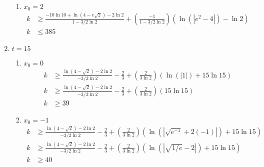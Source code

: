 \documentclass{article}
\begin{document}
\begin{enumerate}
\begin{enumerate}
            \item $x_0 = 2$
             \begin{align*}
                 k &\geq \frac{-10 \ln 10 + \ln(4 - e\sqrt{2}) - 2\ln 2}{1 - 3/2 \ln 2} +
                \left(\frac{-1}{1 - 3/2 \ln 2}\right)(\ln(|e^2 - 4|) - \ln 2)\\
                k &\leq 385
            \end{align*}
        \end{enumerate}
        \item $t = 15$
        \begin{enumerate}
            \item $x_0 = 0$
            \begin{align*}
                k &\geq \frac{\ln(4 - \sqrt{2}) - 2\ln 2}{-3/2 \ln 2} - \frac{2}{3} +
                \left(\frac{2}{3\ln 2}\right)(\ln(|1|) + 15 \ln 15)\\
                k &\geq \frac{\ln(4 - \sqrt{2}) - 2\ln 2}{-3/2 \ln 2} - \frac{2}{3} +
                \left(\frac{2}{3\ln 2}\right)(15 \ln 15)\\
                k & \geq 39
            \end{align*}

            \item $x_0 = -1$
            \begin{align*}
                k &\geq \frac{\ln(4 - \sqrt{2}) - 2\ln 2}{-3/2 \ln 2} - \frac{2}{3} +
                \left(\frac{2}{3\ln 2}\right)(\ln(|\sqrt{e^{-1}} + 2(-1)|) + 15 \ln 15)\\
                k &\geq \frac{\ln(4 - \sqrt{2}) - 2\ln 2}{-3/2 \ln 2} - \frac{2}{3} +
                \left(\frac{2}{3\ln 2}\right)(\ln(|\sqrt{1/e} - 2|) + 15 \ln 15)\\
                k & \geq 40
            \end{align*}


\end{enumerate}
\end{enumerate}
\end{document}
